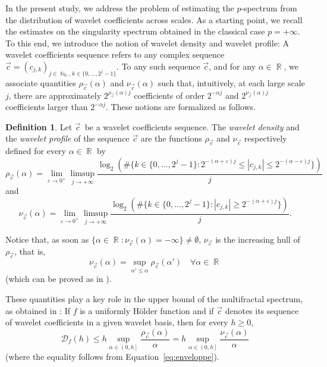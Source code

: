 \documentclass[a4paper,11pt,oneside]{article}
\DeclareMathOperator{\R}{\mathbb{R}}
\DeclareMathOperator{\N}{\mathbb{N}}
\newcommand{\ocint}[1]{\left({#1}\right]}
\newcommand{\modu}[1]{\left\vert{#1}\right\vert}
\theoremstyle{definition}
\newtheorem{defi}{Definition}[section]
\theoremstyle{plain}
\begin{document}
In the present study, we address the problem of estimating the $p$-spectrum from the distribution of wavelet coefficients across scales. As a starting point, we recall the estimates on the singularity spectrum obtained in the classical case $p=+\infty$. To this end, we introduce the notion of wavelet density and wavelet profile: A wavelet coefficients sequence refers to any complex sequence \mbox{$\vec{c}=(c_{j,k})_{j\in\N_0,\,k\in\{0,\ldots,2^j-1\}}$}. To any such sequence $\vec{c}$, and for any $\alpha\in\R$, we associate quantities $\rho_{\vec{c}}(\alpha)$ and $\nu_{\vec{c}}(\alpha)$ such that, intuitively, at each large scale $j$, there are approximately $2^{\rho_{\vec{c}}(\alpha)j}$ coefficients of order $2^{-\alpha j}$ and $2^{\nu_{\vec{c}}(\alpha)j}$ coefficients larger than $2^{-\alpha j}$. These notions are formalized as follows.

\begin{defi}\label{def:prof}
Let $\vec{c}\,$ be a wavelet coefficients sequence. The \textit{wavelet density} and the \textit{wavelet profile} of the sequence $\vec{c}$ are the functions $\rho_{\vec{c}}$ and $\nu_{\vec{c}}$ respectively defined for every $\alpha\in\R$ by
\[
\rho_{\vec{c}}(\alpha)=\lim_{\varepsilon\rightarrow0^+}\limsup_{j\rightarrow+\infty}\frac{\log_2\left(\#\{k\in\{0,\ldots,2^j-1\}:2^{-(\alpha+\varepsilon)j}\leq\modu{c_{j,k}}\leq 2^{-(\alpha-\varepsilon)j}\}\right)}{j}
\]
and
\[
\nu_{\vec{c}}(\alpha)=\lim_{\varepsilon\rightarrow0^+}\limsup_{j\rightarrow+\infty}\frac{\log_2\left(\#\{k\in\{0,\ldots,2^j-1\}:\modu{c_{j,k}}\geq 2^{-(\alpha+\varepsilon)j}\}\right)}{j}.
\]

Notice that, as soon as $\{\alpha\in\R:\nu_{\vec{c}}(\alpha)=-\infty\}\neq\emptyset$, $\nu_{\vec{c}}$ is the increasing hull of $\rho_{\vec{c}}$, that is,
\begin{equation}\label{eq:enveloppe}
\nu_{\vec{c}}(\alpha)=\sup_{\alpha'\leq \alpha} \rho_{\vec{c}}(\alpha')\quad\forall\alpha\in\R
\end{equation}
(which can be proved as in \cite{largeDev}).
\end{defi}

These quantities play a key role in the upper bound of the multifractal spectrum, as obtained in \cite{RWS}: 
If $f$ is a uniformly H\"older function and if $\vec{c}$ denotes its sequence of wavelet coefficients in a given wavelet basis, then for every $h\geq 0$,
\begin{equation}
\label{eq:bornesupHolder}
\mathscr{D}_f(h)\leq h\sup_{\alpha\in\ocint{0,h}}\frac{\rho_{\vec{c}}(\alpha)}{\alpha} = h \sup_{\alpha\in\ocint{0,h}}\frac{\nu_{\vec{c}}(\alpha)}{\alpha}
\end{equation}
(where the equality follows from Equation~\eqref{eq:enveloppe}).
\end{document}

